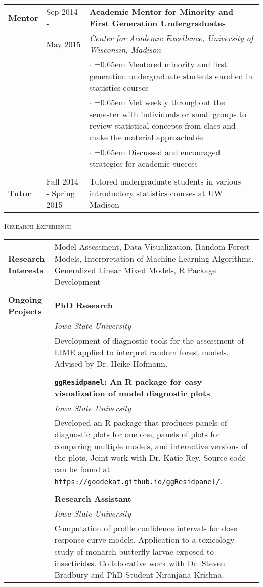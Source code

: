 \documentclass[10pt, oneside]{article}
\begin{document}
\begin{longtable}{p{1.4cm}p{2.1cm}p{13cm}}
\\
\textbf{Mentor} & \hfill{Sep 2014 - } & \textbf{Academic Mentor for Minority and First Generation Undergraduates}\\
& \hfill{May 2015} & \emph{Center for Academic Excellence, University of Wisconsin, Madison} \vspace{0.1cm}\\
& &  $\cdot$ \hangindent=0.65em \hangafter=1 Mentored minority and first generation undergraduate students enrolled in statistics courses\\
& & $\cdot$ \hangindent=0.65em \hangafter=1 Met weekly throughout the semester with individuals or small groups to review statistical concepts from class and make the material approachable\\
& & $\cdot$ \hangindent=0.65em \hangafter=1 Discussed and encouraged strategies for academic success\\
\\
\textbf{Tutor} & \hfill{Fall 2014 - Spring 2015} & Tutored undergraduate students in various introductory statistics courses at UW Madison
\end{longtable}

\noindent \textsc{Research Experience} \hrulefill

\begin{longtable}{p{3.5cm}p{13cm}}
\textbf{Research Interests} & Model Assessment, Data Visualization, Random Forest Models, Interpretation of Machine Learning Algorithms, Generalized Linear Mixed Models, R Package Development\\
\\
\textbf{Ongoing Projects} & \textbf{PhD Research}\\
& \emph{Iowa State University}\\
& Development of diagnostic tools for the assessment of LIME applied to interpret random forest models. Advised by Dr. Heike Hofmann.\\
\\
& \textbf{\texttt{ggResidpanel}: An R package for easy visualization of model diagnostic plots}\\
& \emph{Iowa State University}\\
& Developed an R package that produces panels of diagnostic plots for one one, panels of plots for comparing multiple models, and interactive versions of the plots. Joint work with Dr. Katie Rey. Source code can be found at \texttt{https://goodekat.github.io/ggResidpanel/}.\\
\\
& \textbf{Research Assistant}\\
& \emph{Iowa State University}\\
& Computation of profile confidence intervals for dose response curve models. Application to a toxicology study of monarch butterfly larvae exposed to insecticides. Collaborative work with Dr. Steven Bradbury and PhD Student Niranjana Krishna.
\end{longtable}
\end{document}
